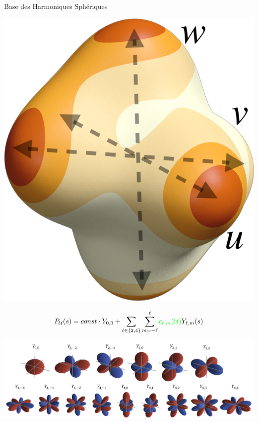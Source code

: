 \begin{frame}{Base des Harmoniques Sphériques}
\begin{overprint}
    
    \begin{minipage}[c]{0.19\textwidth}
        \centering
          \vspace*{.5\baselineskip}
          \hfill
        \includegraphics[width=0.8\linewidth]{img_spm_ff/sperical_3dir4_rot.png}
    \end{minipage}
    \begin{minipage}[c]{0.79\textwidth}
        $$P_\mathcal{U}(s) = const \cdot Y_{0, 0} + \sum_{\ell \in \{2, 4\}} \sum_{m = -\ell}^\ell{{\color{green}c_{\ell, m}(\mathcal{U})}Y_{\ell,m}(s)}$$ 
    \end{minipage}
    
    \vspace*{.5\baselineskip}
    \includegraphics[width=\linewidth]{img_spm_ff/all_sph_harm.PNG} 
    \end{overprint}
\end{frame} 

